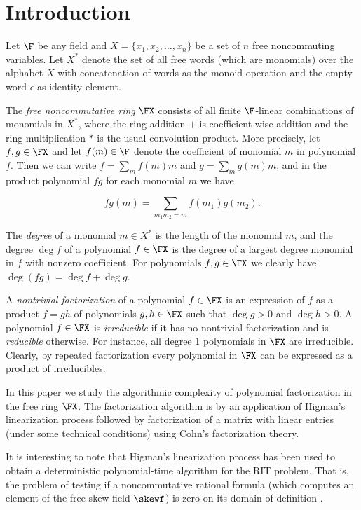 \section{Introduction}\label{intro}

Let $\F$ be any field and $X=\{x_1,x_2,\ldots,x_n\}$ be a set of $n$
free noncommuting variables. Let $X^*$ denote the set of all free
words (which are monomials) over the alphabet $X$ with concatenation
of words as the monoid operation and the empty word $\epsilon$ as
identity element.

The \emph{free noncommutative ring} $\FX$ consists of all finite
$\F$-linear combinations of monomials in $X^*$, where the ring
addition $+$ is coefficient-wise addition and the ring multiplication
$*$ is the usual convolution product. More precisely, let $f,g\in\FX$
and let $f(m)\in\F$ denote the coefficient of monomial $m$ in
polynomial $f$. Then we can write $f=\sum_m f(m) m$ and $g=\sum_m g(m)
m$, and in the product polynomial $fg$ for each monomial $m$ we have

\[
fg(m)=\sum_{m_1m_2=m} f(m_1)g(m_2).
\]

The \emph{degree} of a monomial $m\in X^*$ is the length of the
monomial $m$, and the degree $\deg f$ of a polynomial $f\in\FX$ is the
degree of a largest degree monomial in $f$ with nonzero coefficient.
For polynomials $f,g\in\FX$ we clearly have $\deg (fg) = \deg f + \deg
g$.

A \emph{nontrivial factorization} of a polynomial $f\in\FX$ is an
expression of $f$ as a product $f=gh$ of polynomials $g,h\in\FX$ such
that $\deg g > 0$ and $\deg h > 0$. A polynomial $f\in\FX$ is
\emph{irreducible} if it has no nontrivial factorization and is
\emph{reducible} otherwise.  For instance, all degree $1$ polynomials
in $\FX$ are irreducible. Clearly, by repeated factorization every
polynomial in $\FX$ can be expressed as a product of
irreducibles. 

In this paper we study the algorithmic complexity of polynomial
factorization in the free ring $\FX$. The factorization algorithm is
by an application of Higman's linearization process followed by
factorization of a matrix with linear entries (under some technical
conditions) using Cohn's factorization theory.

It is interesting to note that Higman's linearization process
\cite{Hig} has been used to obtain a deterministic polynomial-time
algorithm for the RIT problem. That is, the problem of testing if a
noncommutative rational formula (which computes an element of the free
skew field $\skewf$) is zero on its domain of definition
\cite{GGOW20,IQS17, IQS18,HW15}.

